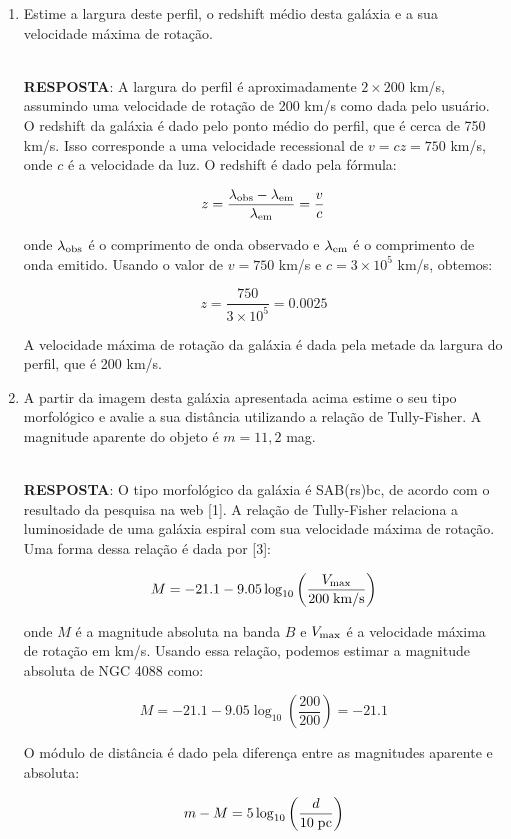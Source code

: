 \documentclass[a4paper,12pt]{article}
\begin{document}
\begin{enumerate}
\begin{enumerate}
\item Estime a largura deste perfil, o redshift médio desta galáxia e a sua 
velocidade máxima de rotação.

\noindent\hrulefill\\\textbf{RESPOSTA}:  A largura do perfil é aproximadamente $2 \times 200$ km/s, assumindo uma velocidade de rotação de 200 km/s como dada pelo usuário. O redshift da galáxia é dado pelo ponto médio do perfil, que é cerca de 750 km/s. Isso corresponde a uma velocidade recessional de $v = cz = 750$ km/s, onde $c$ é a velocidade da luz. O redshift é dado pela fórmula:

$$z = \frac{\lambda_{\rm obs} - \lambda_{\rm em}}{\lambda_{\rm em}} = \frac{v}{c}$$

onde $\lambda_{\rm obs}$ é o comprimento de onda observado e $\lambda_{\rm em}$ é o comprimento de onda emitido. Usando o valor de $v = 750$ km/s e $c = 3 \times 10^5$ km/s, obtemos:

$$z = \frac{750}{3 \times 10^5} = 0.0025$$

A velocidade máxima de rotação da galáxia é dada pela metade da largura do perfil, que é 200 km/s.

\noindent\hrulefill

\item A partir da imagem desta galáxia apresentada acima estime o seu tipo 
morfológico e avalie a sua distância utilizando a relação de Tully-Fisher. A magnitude aparente do objeto é $m=11,2$ mag.

\noindent\hrulefill\\\textbf{RESPOSTA}: O tipo morfológico da galáxia é SAB(rs)bc, de acordo com o resultado da pesquisa na web [1]. A relação de Tully-Fisher relaciona a luminosidade de uma galáxia espiral com sua velocidade máxima de rotação. Uma forma dessa relação é dada por [3]:

$$M = -21.1 - 9.05 \log_{10} \left( \frac{V_{\rm max}}{200 \; {\rm km/s}} \right)$$

onde $M$ é a magnitude absoluta na banda $B$ e $V_{\rm max}$ é a velocidade máxima de rotação em km/s. Usando essa relação, podemos estimar a magnitude absoluta de NGC 4088 como:

$$M = -21.1 - 9.05 \log_{10} \left( \frac{200}{200} \right) = -21.1$$

O módulo de distância é dado pela diferença entre as magnitudes aparente e absoluta:

$$m - M = 5 \log_{10} \left( \frac{d}{10 \; {\rm pc}} \right)$$


\end{enumerate}
\end{enumerate}
\end{document}
